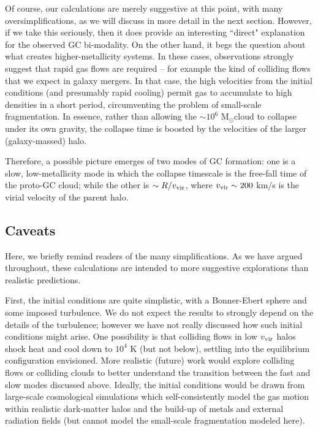 \documentclass[useAMS,usenatbib]{mn2e}
\newcommand{\msun}{{M$_\odot$}}
\begin{document}
Of course, our calculations are merely suggestive at this point, with many oversimplifications, as we will discuss in more detail in the next section.  However, if we take this seriously, then it does provide an interesting ``direct" explanation for the observed GC bi-modality.  On the other hand, it begs the question about what creates higher-metallicity systems.  In these cases, observations strongly suggest that rapid gas flows are required -- for example the kind of colliding flows that we expect in galaxy mergers.  In that case, the high velocities from the initial conditions (and presumably rapid cooling) permit gas to accumulate to high densities in a short period, circumventing the problem of small-scale fragmentation.  In essence, rather than allowing the $\sim 10^6$ \msun cloud to collapse under its own gravity, the collapse time is boosted by the velocities of the larger (galaxy-massed) halo.  

Therefore, a possible picture emerges of two modes of GC formation: one is a slow, low-metallicity mode in which the collapse timescale is the free-fall time of the proto-GC cloud; while the other is $\sim R/v_{\rm vir}$, where $v_{\rm vir} \sim 200$ km/s is the virial velocity of the parent halo.




\subsection{Caveats}

Here, we briefly remind readers of the many simplifications.  As we have argued throughout, these calculations are intended to more suggestive explorations than realistic predictions.  

First, the initial conditions are quite simplistic, with a Bonner-Ebert sphere and some imposed turbulence.  We do not expect the results to strongly depend on the details of the turbulence; however we have not really discussed how such initial conditions might arise.  One possibility is that colliding flows in low $v_{\rm vir}$ halos shock heat and cool down to $10^4$ K (but not below), settling into the equilibrium configuration envisioned.  More realistic (future) work would explore colliding flows or colliding clouds to better understand the transition between the fast and slow modes discussed above.  Ideally, the initial conditions would be drawn from large-scale cosmological simulations which self-consistently model the gas motion within realistic dark-matter halos and the build-up of metals and external radiation fields (but cannot model the small-scale fragmentation modeled here).
\end{document}
